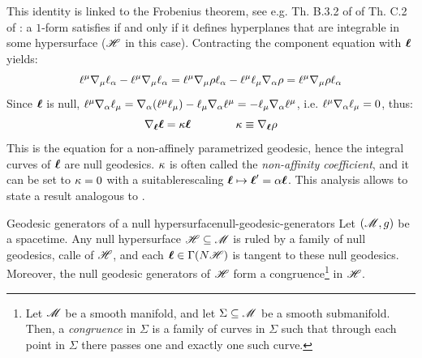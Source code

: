 This identity is linked to the Frobenius theorem, see e.g. Th. B.3.2 of \cite{wald} of Th. C.2 of \cite{straumann}: a $ 1 $-form satisfies  if and only if it defines hyperplanes that are integrable in some hypersurface ($ \mathscr{H} $ in this case). Contracting the component equation  with $ \boldsymbol{\ell} $ yields:
\begin{equation*}
  \ell^\mu \nabla_\mu \ell_\alpha - \ell^\mu \nabla_\mu \ell_\alpha = \ell^\mu \nabla_\mu \rho \ell_\alpha - \ell^\mu \ell_\mu \nabla_\alpha \rho = \ell^\mu \nabla_\mu \rho \ell_\alpha
\end{equation*}
Since $ \boldsymbol{\ell} $ is null, $ \ell^\mu \nabla_\alpha \ell_\mu = \nabla_\alpha (\ell^\mu \ell_\mu) - \ell_\mu \nabla_\alpha \ell^\mu = - \ell_\mu \nabla_\alpha \ell^\mu $, i.e. $ \ell^\mu \nabla_\alpha \ell_\mu = 0 $, thus:
\begin{equation}
  \nabla_{\boldsymbol{\ell}} \boldsymbol{\ell} = \kappa \boldsymbol{\ell}
  \qquad \qquad
  \kappa \equiv \nabla_{\boldsymbol{\ell}} \rho
\end{equation}
This is the equation for a non-affinely parametrized geodesic, hence the integral curves of $ \boldsymbol{\ell} $ are null geodesics. $ \kappa $ is often called the \emph{non-affinity coefficient}, and it can be set to $ \kappa = 0 $ with a suitable\footnotemark rescaling $ \boldsymbol{\ell} \mapsto \boldsymbol{\ell}' = \alpha \boldsymbol{\ell} $. This analysis allows to state a result analogous to .


\begin{proposition}{Geodesic generators of a null hypersurface}{null-geodesic-generators}
  Let $ (\mathscr{M} , g) $ be a spacetime. Any null hypersurface $ \mathscr{H} \subseteq \mathscr{M} $ is ruled by a family of null geodesics, calle  of $ \mathscr{H} $, and each $ \boldsymbol{\ell} \in \Gamma(N \mathscr{H}) $ is tangent to these null geodesics. Moreover, the null geodesic generators of $ \mathscr{H} $ form a congruence\footnote{Let $ \mathscr{M} $ be a smooth manifold, and let $ \Sigma \subseteq \mathscr{M} $ be a smooth submanifold. Then, a \emph{congruence} in $ \Sigma $ is a family of curves in $ \Sigma $ such that through each point in $ \Sigma $ there passes one and exactly one such curve.} in $ \mathscr{H} $.
\end{proposition}

